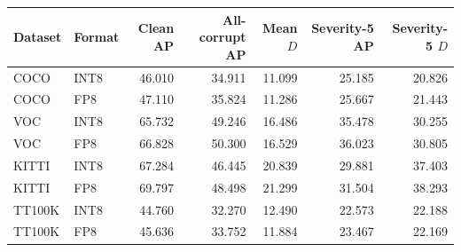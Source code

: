 \begin{tabular}{llrrrrr}
\toprule
Dataset & Format & Clean AP & All-corrupt AP & Mean $D$ & Severity-5 AP & Severity-5 $D$ \\
\midrule
COCO & INT8 & 46.010 & 34.911 & 11.099 & 25.185 & 20.826 \\
COCO & FP8 & 47.110 & 35.824 & 11.286 & 25.667 & 21.443 \\
VOC & INT8 & 65.732 & 49.246 & 16.486 & 35.478 & 30.255 \\
VOC & FP8 & 66.828 & 50.300 & 16.529 & 36.023 & 30.805 \\
KITTI & INT8 & 67.284 & 46.445 & 20.839 & 29.881 & 37.403 \\
KITTI & FP8 & 69.797 & 48.498 & 21.299 & 31.504 & 38.293 \\
TT100K & INT8 & 44.760 & 32.270 & 12.490 & 22.573 & 22.188 \\
TT100K & FP8 & 45.636 & 33.752 & 11.884 & 23.467 & 22.169 \\
\bottomrule
\end{tabular}

